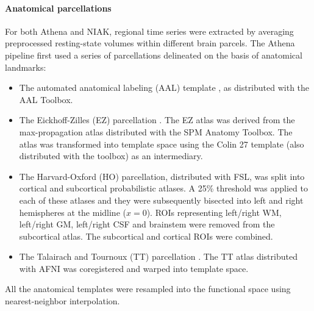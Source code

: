 \documentclass[preprint,12pt,3p]{elsarticle}
\begin{document}
\paragraph{Anatomical parcellations} For both Athena and NIAK, regional time series were extracted by averaging preprocessed resting-state volumes within different brain parcels. The Athena pipeline first used a series of parcellations delineated on the basis of anatomical landmarks:
\begin{itemize}
\item The automated anatomical labeling (AAL) template \citep{tzourio2002automated}, as distributed with the AAL Toolbox. 
\item The Eickhoff-Zilles (EZ) parcellation \citep{eickhoff2005new}. The EZ atlas was derived from the max-propagation atlas distributed with the SPM Anatomy Toolbox. The atlas was transformed into template space using the Colin 27 template (also distributed with the toolbox) as an intermediary. 
\item The Harvard-Oxford (HO) parcellation, distributed with FSL, was split into cortical and subcortical probabilistic atlases. A 25\% threshold was applied to each of these atlases and they were subsequently bisected into left and right hemispheres at the midline ($x=0$). ROIs representing left/right WM, left/right GM, left/right CSF and brainstem were removed from the subcortical atlas. The subcortical and cortical ROIs were combined.
\item The Talairach and Tournoux (TT) parcellation \citep{Lancaster2000automated}. The TT atlas distributed with AFNI was coregistered and warped into template space.
\end{itemize}
All the anatomical templates were resampled into the functional space using nearest-neighbor interpolation. 
\end{document}
